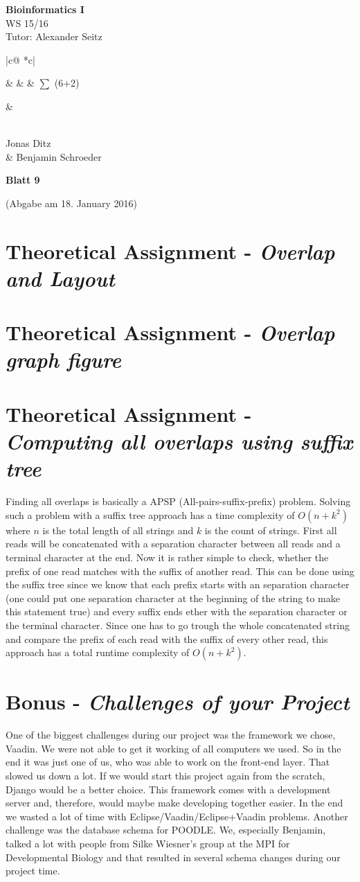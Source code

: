 \documentclass[%
   10pt,              %
   ngerman,           %
   a4paper,           %
   DIV11,             %
]{scrartcl}%
\makeatletter
\def\header#1#2#3#4#5#6#7{\pagestyle{empty}
\noindent
\begin{minipage}[t]{0.6\textwidth}
\begin{flushleft}
\textbf{#4}\\%
#6\\%
Tutor: #2  %
\end{flushleft}
\end{minipage}
\begin{minipage}[t]{0.4\textwidth}
\begin{flushright}
\points{#7}%
\vspace*{0.2cm}
#5%
\end{flushright}
\end{minipage}

\begin{center}
{\Large\textbf{ Blatt #1}} %

{(Abgabe am #3)} %
\end{center}
}
\newenvironment{vartab}[1]
{
    \begin{tabular}{ |c@{} *{#1}{c|} } %
}{
    \end{tabular}
}
\newcommand{\myformat}[1]{& #1}
\newcommand{\numbers}[1]{
  \newcounter{ctra}
\setcounter{ctra}{1}
\whiledo {\value{ctra} < #1}%
{%
  \myformat{\thectra}
  \stepcounter{ctra}%
}
\myformat{\thectra}
}
\newcommand{\emptyLine}[1]{
  \newcounter{ctra1}
\setcounter{ctra}{1}
\whiledo {\value{ctra1} < #1}%
{%
  \myformat{\hspace*{0.5cm}}
  \stepcounter{ctra1}%
}
}
\newcommand{\points}[1]{
\newcounter{colmns}
\setcounter{colmns}{#1}
\stepcounter{colmns}
  \begin{vartab}{\thecolmns}
    \numbers{#1} & $\sum$ (6+2)\\\hline
    \emptyLine{\thecolmns}\\
  \end{vartab}
}
\makeatother
\begin{document}
\header{9}{Alexander Seitz}{18. January 2016}{Bioinformatics I}{\\Jonas Ditz \\\& Benjamin Schroeder}{WS 15/16}{4}

\section*{Theoretical Assignment - \textit{Overlap and Layout}}


\section*{Theoretical Assignment - \textit{Overlap graph figure}}
 
 
\section*{Theoretical Assignment - \textit{Computing all overlaps using suffix tree}}

Finding all overlaps is basically a APSP (All-pairs-suffix-prefix) problem. Solving such a problem 
with a suffix tree approach has a time complexity of $O(n + k^2)$ where $n$ is the total length of 
all strings and $k$ is the count of strings. First all reads will be concatenated with a separation 
character between all reads and a terminal character at the end. Now it is rather simple to check, 
whether the prefix of one read matches with the suffix of another read. This can be done using the 
suffix tree since we know that each prefix starts with an separation character (one could put one 
separation character at the beginning of the string to make this statement true) and every suffix 
ends ether with the separation character or the terminal character. Since one has to go trough the 
whole concatenated string and compare the prefix of each read with the suffix of every other read, 
this approach has a total runtime complexity of $O(n+k^2)$.

\section*{Bonus - \textit{Challenges of your Project}}

One of the biggest challenges during our project was the framework we chose, Vaadin. We were not able 
to get it working of all computers we used. So in the end it was just one of us, who was able to work 
on the front-end layer. That slowed us down a lot. If we would start this project again from the scratch, 
Django would be a better choice. This framework comes with a development server and, therefore, would 
maybe make developing together easier. In the end we wasted a lot of time with Eclipse/Vaadin/Eclipse+Vaadin 
problems. Another challenge was the database schema for POODLE. We, especially Benjamin, talked a lot 
with people from Silke Wiesner's group at the MPI for Developmental Biology and that resulted in 
several schema changes during our project time.
\end{document}
